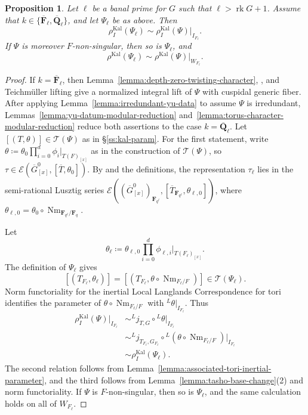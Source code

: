 \documentclass[reqno]{amsart}
\numberwithin{equation}{subsection}
\newcommand{\F}{\mathbf{F}}
\newcommand{\Q}{\mathbf{Q}}
\newcommand{\ol}[1]{\overline{#1}}
\newcommand{\ld}{{}^L}
\newcommand\cE{\mathcal{E}}
\newcommand\cT{\mathcal{T}}
\DeclareMathOperator{\Nm}{Nm}
\DeclareMathOperator{\Kal}{Kal}
\DeclareMathOperator{\rk}{rk}
\newtheorem{prop}[thm]{Proposition}
\theoremstyle{remark}
\numberwithin{equation}{subsection}
\numberwithin{figure}{subsection}
\begin{document}
\begin{prop}\label{prop:kal-base-change}
Let $\ell$ be a banal prime for $G$ such that $\ell > \rk G + 1$. Assume that $k\in\{\ol\F_\ell,\ol\Q_\ell\}$, and let $\Psi_\ell$ be as above. Then
\[
\rho_I^{\Kal}(\Psi_\ell)\sim
\rho_I^{\Kal}(\Psi)|_{I_{F_\ell}}.
\]
If $\Psi$ is moreover $F$-non-singular, then so is $\Psi_\ell$, and
\[
\rho^{\Kal}(\Psi_\ell)\sim
\rho^{\Kal}(\Psi)|_{W_{F_\ell}}.
\]
\end{prop}

\begin{proof}
If $k=\ol\F_\ell$, then Lemma~\ref{lemma:depth-zero-twisting-character}, \cite[Lemma~3.5.16]{Cot26b}, and Teichm\"uller lifting give a normalized integral lift of $\Psi$ with cuspidal generic fiber. After applying Lemma~\ref{lemma:irredundant-yu-data} to assume $\Psi$ is irredundant, Lemmas~\ref{lemma:yu-datum-modular-reduction} and~\ref{lemma:torus-character-modular-reduction} reduce both assertions to the case $k = \ol\Q_\ell$. Let $[(T, \theta)] \in\cT(\Psi)$ as in \S\ref{ss:kal-param}. For the first statement, write $\theta\coloneqq\theta_0\prod_{i=0}^d\phi_i|_{T(F)_{[x]}}$ as in the construction of $\cT(\Psi)$, so $\tau \in \cE(\ol G^0_{[x]}, [\ol T, \theta_0])$. By \cite[Proposition~4.3.4(2)]{Cot26b} and the definitions, the representation $\tau_\ell$ lies in the semi-rational Lusztig series $\cE((\ol G^0_{[x]})_{\F_{q^\ell}}, [\ol T_{\F_{q^\ell}}, \theta_{\ell,0}])$, where $\theta_{\ell,0} = \theta_0 \circ \Nm_{\F_{q^\ell}/\F_q}$.

Let
\[
\theta_\ell
\coloneqq
\theta_{\ell,0}
\prod_{i=0}^d\phi_{\ell,i}|_{T(F_\ell)_{[x]}}.
\]
The definition of $\Psi_\ell$ gives
\[
[(T_{F_\ell},\theta_\ell)]
=
[(T_{F_\ell},\theta\circ \Nm_{F_\ell/F})]
\in\cT(\Psi_\ell).
\]
Norm functoriality for the inertial Local Langlands Correspondence for tori identifies the parameter of $\theta\circ \Nm_{F_\ell/F}$ with $\ld\theta|_{I_{F_\ell}}$.
Thus
\begin{align*}
\rho_I^{\Kal}(\Psi)|_{I_{F_\ell}}
    &\sim \ld j_{T,G}\circ\ld\theta|_{I_{F_\ell}}\\
    &\sim \ld j_{T_{F_\ell},G_{F_\ell}}
        \circ\ld(\theta\circ \Nm_{F_\ell/F})|_{I_{F_\ell}}\\
    &\sim \rho_I^{\Kal}(\Psi_\ell).
\end{align*}
The second relation follows from Lemma~\ref{lemma:associated-tori-inertial-parameter}, and the third follows from Lemma~\ref{lemma:tasho-base-change}(2) and norm functoriality. If $\Psi$ is $F$-non-singular, then so is $\Psi_\ell$, and the same calculation holds on all of $W_{F_\ell}$.
\end{proof}
\end{document}
